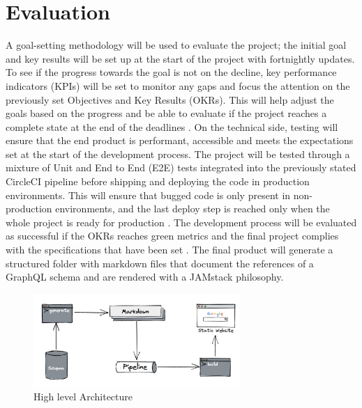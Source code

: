 \section*{Evaluation}
\label{s:Evaluation}
A goal-setting methodology will be used to evaluate the project; the initial
goal and key results will be set up at the start of the project with fortnightly
updates. To see if the progress towards the goal is not on the decline, key
performance indicators (KPIs) will be set to monitor any gaps and focus the
attention on the previously set Objectives and Key Results (OKRs). This will
help adjust the goals based on the progress and be able to evaluate if the
project reaches a complete state at the end of the deadlines
\citep{helmoldLeanManagementKPI2020}. On the technical side, testing will ensure
that the end product is performant, accessible and meets the expectations set at
the start of the development process. The project will be tested through a
mixture of Unit and End to End (E2E) tests integrated into the previously stated
CircleCI pipeline before shipping and deploying the code in production
environments. This will ensure that bugged code is only present in
non-production environments, and the last deploy step is reached only when the
whole project is ready for production \citep{yuUtilisingCIEnvironment2020}. The
development process will be evaluated as successful if the OKRs reaches green
metrics and the final project complies with the specifications that have been
set \citep{helmoldLeanManagementKPI2020}. The final product will generate a
structured folder with markdown files that document the references of a GraphQL
schema and are rendered with a JAMstack philosophy.
\begin{figure}[H]
  \centering
  \includegraphics[width=0.7\textwidth]{figures/architecture}
  \caption{High level Architecture}
  \label{f:architecture}
\end{figure}
